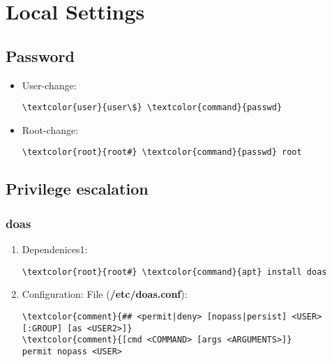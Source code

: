 \documentclass[10pt, a4paper, onecolumn, openany]{book} %
\begin{document}
\chapter{Local Settings}
\section{Password}
\begin{itemize}
    \item User-change:
\begin{Verbatim}[commandchars=\\\{\}]
\textcolor{user}{user\$} \textcolor{command}{passwd}
\end{Verbatim}
    \item Root-change:
\begin{Verbatim}[commandchars=\\\{\}]
\textcolor{root}{root#} \textcolor{command}{passwd} root
\end{Verbatim}
\end{itemize}
\section{Privilege escalation}
\subsection{doas}
\begin{enumerate}
    \item Dependenices1:
\begin{Verbatim}[commandchars=\\\{\}]
\textcolor{root}{root#} \textcolor{command}{apt} install doas
\end{Verbatim}
    \item Configuration:
\newline File (\textbf{\textcolor{file}{/etc/doas.conf}}):
\begin{Verbatim}[commandchars=\\\{\}]
\textcolor{comment}{## <permit|deny> [nopass|persist] <USER>[:GROUP] [as <USER2>]}
\textcolor{comment}{[cmd <COMMAND> [args <ARGUMENTS>]}
permit nopass <USER>
\end{Verbatim}    
\end{enumerate}
\end{document}
